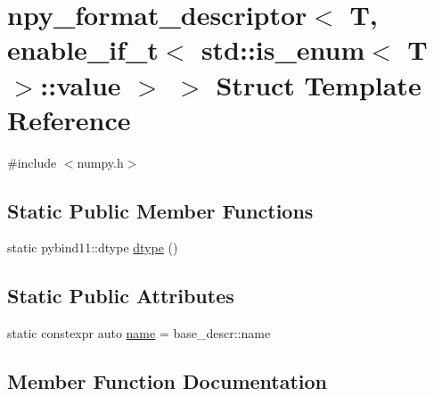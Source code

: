 \hypertarget{structnpy__format__descriptor_3_01_t_00_01enable__if__t_3_01std_1_1is__enum_3_01_t_01_4_1_1value_01_4_01_4}{}\section{npy\+\_\+format\+\_\+descriptor$<$ T, enable\+\_\+if\+\_\+t$<$ std\+::is\+\_\+enum$<$ T $>$\+::value $>$ $>$ Struct Template Reference}
\label{structnpy__format__descriptor_3_01_t_00_01enable__if__t_3_01std_1_1is__enum_3_01_t_01_4_1_1value_01_4_01_4}


{\ttfamily \#include $<$numpy.\+h$>$}

\subsection*{Static Public Member Functions}
\begin{DoxyCompactItemize}
\item 
static pybind11\+::dtype \mbox{\hyperlink{structnpy__format__descriptor_3_01_t_00_01enable__if__t_3_01std_1_1is__enum_3_01_t_01_4_1_1value_01_4_01_4_ab86909b4ce4253a9e94b82c4a09fcd61}{dtype}} ()
\end{DoxyCompactItemize}
\subsection*{Static Public Attributes}
\begin{DoxyCompactItemize}
\item 
static constexpr auto \mbox{\hyperlink{structnpy__format__descriptor_3_01_t_00_01enable__if__t_3_01std_1_1is__enum_3_01_t_01_4_1_1value_01_4_01_4_a22bcbb11a0d4d204723ffdf2844b4b32}{name}} = base\+\_\+descr\+::name
\end{DoxyCompactItemize}


\subsection{Member Function Documentation}
\mbox{\label{structnpy__format__descriptor_3_01_t_00_01enable__if__t_3_01std_1_1is__enum_3_01_t_01_4_1_1value_01_4_01_4_ab86909b4ce4253a9e94b82c4a09fcd61}} 
